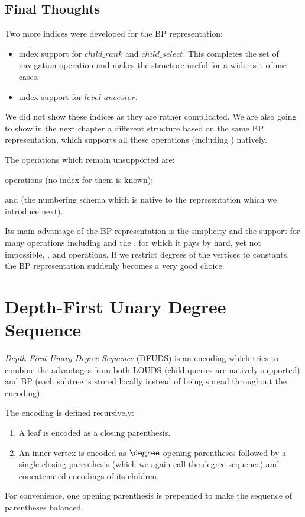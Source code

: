 \subsection{Final Thoughts}


Two more indices were developed for the BP representation:
\begin{itemize}
	\item index support for $child\_rank$ and $child\_select$.
	This completes the set of navigation operation and makes the structure useful for a wider set of use cases.

	\item index support for $level\_ancestor$.
\end{itemize}
We did not show these indices as they are rather complicated.
We are also going to show in the next chapter a different structure based on the same BP representation, which supports all these operations (including \levelAny{}) natively.

The operations which remain unsupported are:
\begin{iteminline}
	\item \levelAny{} operations (no index for them is known);
	\item \dfudsRank{} and \dfudsSelect{} (the numbering schema which is native to the representation which we introduce next).
\end{iteminline}

Its main advantage of the BP representation is the simplicity and the support for many operations including \lca{} and the \dep{}, for which it pays by hard, yet not impossible, \childRank{}, \childSelect{} and \degree{} operations.
If we restrict degrees of the vertices to constants, the BP representation suddenly becomes a very good choice.

\section{Depth-First Unary Degree Sequence}

\emph{Depth-First Unary Degree Sequence} (DFUDS) is an encoding which tries to combine the advantages from both LOUDS (child queries are natively supported) and BP (each subtree is stored locally instead of being spread throughout the encoding).

The encoding is defined recursively:
\begin{enumerate}
	\item A leaf is encoded as a closing parenthesis.
	\item An inner vertex is encoded as $\degree$ opening parentheses followed by a single closing parenthesis (which we again call the degree sequence) and concatenated encodings of its children.
\end{enumerate}
For convenience, one opening parenthesis is prepended to make the sequence of parentheses balanced.

